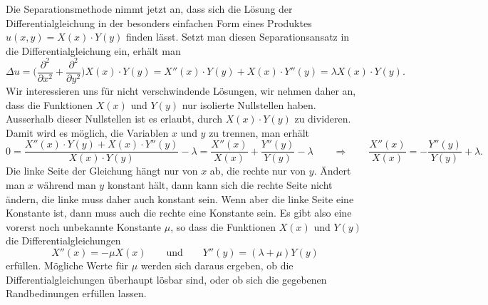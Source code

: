 Die Separationsmethode nimmt jetzt an, dass sich die Lösung der
Differentialgleichung in der besonders einfachen Form eines Produktes
$u(x,y)=X(x)\cdot Y(y)$ finden lässt.
Setzt man diesen Separationsansatz
in die Differentialgleichung ein, erhält man
\[
\Delta u
=
\biggl(
\frac{\partial^2}{\partial x^2}
+
\frac{\partial^2}{\partial y^2}
\biggr)
X(x)\cdot Y(y)
=
X''(x)\cdot Y(y) + X(x)\cdot Y''(y)
=
\lambda X(x)\cdot Y(y).
\]
Wir interessieren uns für nicht verschwindende Lösungen, wir nehmen daher
an, dass die Funktionen $X(x)$ und $Y(y)$ nur isolierte Nullstellen haben.
Ausserhalb dieser Nullstellen ist es erlaubt, durch $X(x)\cdot Y(y)$ zu
divideren. 
Damit wird es möglich, die Variablen $x$ und $y$ zu trennen, man
erhält
\[
0
=
\frac{X''(x)\cdot Y(y) + X(x)\cdot Y''(y)}{X(x)\cdot Y(y)} - \lambda
=
\frac{X''(x)}{X(x)}
+
\frac{Y''(y)}{Y(y)}
-
\lambda
\qquad\Rightarrow\qquad
\frac{X''(x)}{X(x)}=-\frac{Y''(y)}{Y(y)}+\lambda.
\]
Die linke Seite der Gleichung hängt nur von $x$ ab, die rechte nur von $y$.
Ändert man $x$ während man $y$ konstant hält, dann kann sich die rechte
Seite nicht ändern, die linke muss daher auch konstant sein.
Wenn aber die linke Seite eine Konstante ist, dann muss auch die rechte
eine Konstante sein. 
Es gibt also eine vorerst noch unbekannte Konstante $\mu$, so dass
die Funktionen $X(x)$ und $Y(y)$ die Differentialgleichungen
\begin{equation}
X''(x) = -\mu X(x)
\qquad\text{und}\qquad
Y''(y) = (\lambda+\mu)Y(y)
\label{skript:separation:gleichungen}
\end{equation}
erfüllen.
Mögliche Werte für $\mu$ werden sich daraus ergeben, ob die
Differentialgleichungen überhaupt lösbar sind, oder ob
sich die gegebenen Randbedinungen erfüllen lassen.

